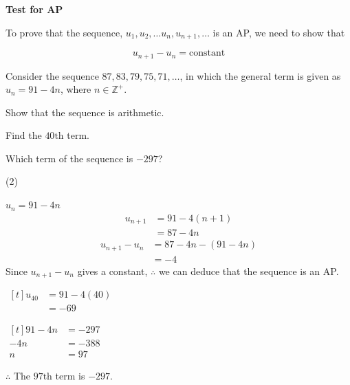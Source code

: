 \documentclass[11pt,a4paper]{book}
\newcommand{\Z}{\mathbb{Z}}
\begin{document}
\begin{tcolorbox}[colback=blue!5, colframe=black,boxrule=.4pt, sharpish corners]

\textbf{Test for AP}

\medskip{}

To prove that the sequence, $u_{1},u_{2},\ldots u_{n},u_{n+1},\ldots$ is an AP, we need to show that

\[
u_{n+1}-u_{n}=\text{constant}
\]
\end{tcolorbox}

\begin{example}

Consider the sequence $87,83,79,75,71,\ldots$, in which the general term is given as $u_{n}=91-4n$, where $n\in\Z^{+}$.

\begin{tasks}[label=(\alph*),label-width=3.5ex]
\task  Show that the sequence is arithmetic.

\task  Find the $40\text{th}$ term.

\task  Which term of the sequence is $-297$?

\end{tasks} 

\Solution

\begin{tasks}[label=(\alph*),label-width=3.5ex] (2)

\task*  $u_{n}=91-4n$
\begin{align*}
u_{n+1} & =91-4\left(n+1\right)\\
 & =87-4n
\end{align*}
\begin{align*}
u_{n+1}-u_{n} & =87-4n-\left(91-4n\right)\\
 & =-4
\end{align*}
Since $u_{n+1}-u_{n}$ gives a constant, $\therefore$ we can deduce that the sequence is an AP.

\task  
$
\begin{aligned}[t]
u_{40} & =91-4\left(40\right)\\
 & =-69
\end{aligned}
$

\task 
$
\begin{aligned}[t]
91-4n & =-297\\
-4n & =-388\\
n & =97
\end{aligned}
$

$\therefore$ The $97\text{th}$ term is $-297$.

\end{tasks} 

\end{example}
\end{document}
